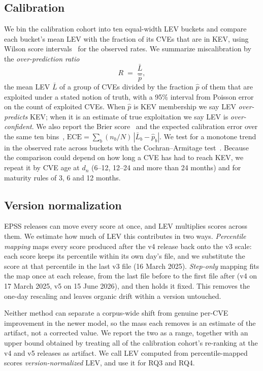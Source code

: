 \subsection{Calibration}\label{sec:m-calib}

We bin the calibration cohort into ten equal-width LEV buckets and compare each
bucket's mean LEV with the fraction of its CVEs that are in KEV, using Wilson
score intervals~\cite{wilson1927} for the observed rates. We summarize
miscalibration by the \emph{over-prediction ratio}
\begin{equation}\label{eq:ratio}
R \;=\; \frac{\bar{L}}{\hat{p}},
\end{equation}
the mean LEV $\bar{L}$ of a group of CVEs divided by the fraction $\hat{p}$ of
them that are exploited under a stated notion of truth, with a 95\% interval
from Poisson error on the count of exploited CVEs. When $\hat{p}$ is KEV
membership we say LEV \emph{over-predicts} KEV; when it is an estimate of true
exploitation we say LEV is \emph{over-confident}. We also report the Brier
score~\cite{brier1950} and the expected calibration error over the same ten
bins~\cite{naeini2015ece},
$\mathrm{ECE} = \sum_b (n_b/N)\,|\bar{L}_b - \hat{p}_b|$. We test for a
monotone trend in the observed rate across buckets with the Cochran--Armitage
test~\cite{armitage1955trend}. Because the comparison could depend on how long a CVE has had to reach
KEV, we repeat it by CVE age at $d_n$ (6--12, 12--24 and more than 24 months)
and for maturity rules of 3, 6 and 12 months.

\subsection{Version normalization}\label{sec:m-version}

EPSS releases can move every score at once, and LEV multiplies scores across
them. We estimate how much of LEV this contributes in two ways.
\emph{Percentile mapping} maps every score produced after the v4 release back
onto the v3 scale: each score keeps its percentile within its own day's file,
and we substitute the score at that percentile in the last v3 file
(16 March 2025). \emph{Step-only} mapping fits the map once at each release,
from the last file before to the first file after (v4 on 17 March 2025, v5 on
15 June 2026), and then holds it fixed. This removes the one-day rescaling and
leaves organic drift within a version untouched.

Neither method can separate a corpus-wide shift from genuine per-CVE
improvement in the newer model, so the mass each removes is an estimate of the
artifact, not a corrected value. We report the two as a range, together with an
upper bound obtained by treating all of the calibration cohort's re-ranking at
the v4 and v5 releases as artifact. We call LEV computed from percentile-mapped scores
\emph{version-normalized} LEV, and use it for RQ3 and RQ4.

